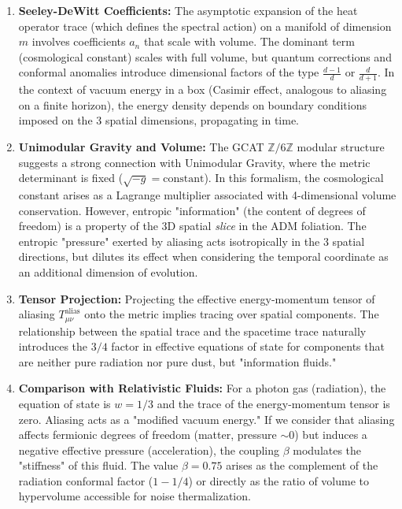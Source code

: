 \documentclass[12pt, a4paper]{article}
\theoremstyle{plain}
\theoremstyle{definition}
\begin{document}
\begin{enumerate}
    \item \textbf{Seeley-DeWitt Coefficients:} The asymptotic expansion of the heat operator trace (which defines the spectral action) on a manifold of dimension $m$ involves coefficients $a_n$ that scale with volume. The dominant term (cosmological constant) scales with full volume, but quantum corrections and conformal anomalies introduce dimensional factors of the type $\frac{d-1}{d}$ or $\frac{d}{d+1}$. In the context of vacuum energy in a box (Casimir effect, analogous to aliasing on a finite horizon), the energy density depends on boundary conditions imposed on the 3 spatial dimensions, propagating in time.
    
    \item \textbf{Unimodular Gravity and Volume:} The GCAT $\mathbb{Z}/6\mathbb{Z}$ modular structure suggests a strong connection with Unimodular Gravity, where the metric determinant is fixed ($\sqrt{-g} = \text{constant}$). In this formalism, the cosmological constant arises as a Lagrange multiplier associated with 4-dimensional volume conservation. However, entropic "information" (the content of degrees of freedom) is a property of the 3D spatial \textit{slice} in the ADM foliation. The entropic "pressure" exerted by aliasing acts isotropically in the 3 spatial directions, but dilutes its effect when considering the temporal coordinate as an additional dimension of evolution.
    
    \item \textbf{Tensor Projection:} Projecting the effective energy-momentum tensor of aliasing $T_{\mu\nu}^{\text{alias}}$ onto the metric implies tracing over spatial components. The relationship between the spatial trace and the spacetime trace naturally introduces the $3/4$ factor in effective equations of state for components that are neither pure radiation nor pure dust, but "information fluids."
    
    \item \textbf{Comparison with Relativistic Fluids:} For a photon gas (radiation), the equation of state is $w = 1/3$ and the trace of the energy-momentum tensor is zero. Aliasing acts as a "modified vacuum energy." If we consider that aliasing affects fermionic degrees of freedom (matter, pressure $\sim 0$) but induces a negative effective pressure (acceleration), the coupling $\beta$ modulates the "stiffness" of this fluid. The value $\beta = 0.75$ arises as the complement of the radiation conformal factor ($1 - 1/4$) or directly as the ratio of volume to hypervolume accessible for noise thermalization.
\end{enumerate}
\end{document}

